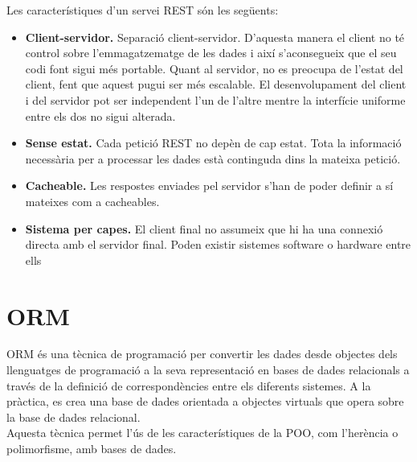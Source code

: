 Les característiques d'un servei \ac{REST} són les següents:
\begin{itemize}
	
	\item \textbf{Client-servidor.} Separació client-servidor. D'aquesta manera el client no té control sobre l'emmagatzematge de les dades i així s'aconsegueix que el seu codi font sigui més portable. Quant al servidor, no es preocupa de l'estat del client, fent que aquest pugui ser més escalable. El desenvolupament del client i del servidor pot ser independent l'un de l'altre mentre la interfície uniforme entre els dos no sigui alterada.
	
	\item \textbf{Sense estat.} Cada petició \ac{REST} no depèn de cap estat. Tota la informació necessària per a processar les dades està continguda dins la mateixa petició.
	
	\item \textbf{Cacheable.} Les respostes enviades pel servidor s'han de poder definir a sí mateixes com a cacheables.
	
	\item \textbf{Sistema per capes.} El client final no assumeix que hi ha una connexió directa amb el servidor final. Poden existir sistemes software o hardware entre ells
	
\end{itemize}

\section{\ac{ORM}}
\ac{ORM} és una tècnica de programació per convertir les dades desde objectes dels llenguatges de programació a la seva representació en bases de dades relacionals a través de la definició de correspondències entre els diferents sistemes. A la pràctica, es crea una base de dades orientada a objectes virtuals que opera sobre la base de dades relacional.\\

Aquesta tècnica permet l'ús de les característiques de la \ac{POO}, com l'herència o polimorfisme,  amb bases de dades.
